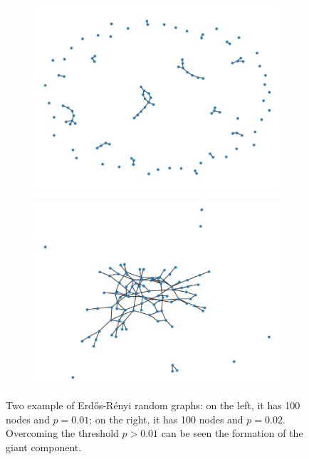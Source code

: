 \begin{figure}[ht!]
    \centering
    \begin{subfigure}[t]{0.49\textwidth}
        \centering
        \includegraphics[width=\linewidth]{image/E_R_N100_p0,01.png}
    \end{subfigure}
    \hfill
    \begin{subfigure}[t]{0.49\textwidth}
        \centering
        \includegraphics[width=\linewidth]{image/E_R_N100_p0,02.png}
    \end{subfigure}
    \caption{Two example of Erd\H{o}s-Rényi random graphs: on the left, it has 100 nodes and $p = 0.01$; on the right, it has 100 nodes and $p = 0.02$. Overcoming the threshold $p > 0.01$ can be seen the formation of the giant component.}
    \label{E-R_example}
\end{figure}

